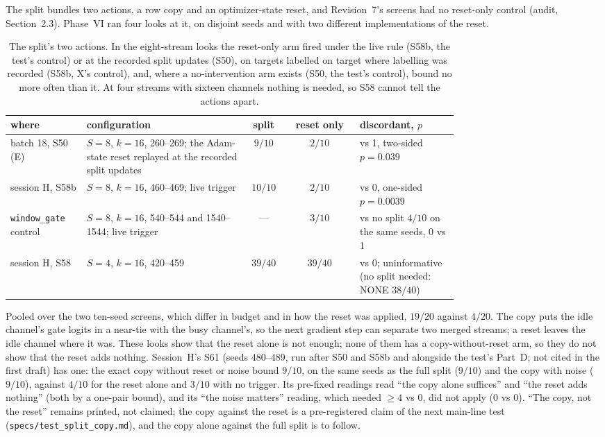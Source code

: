 \documentclass[11pt]{article}
\begin{document}
The split bundles two actions, a row copy and an optimizer-state reset, and Revision~7's screens had no reset-only control (audit, Section~2.3). Phase~VI ran four looks at it, on disjoint seeds and with two different implementations of the reset.

\begin{table}[h]
\centering
\small
\begin{tabular}{@{}>{\raggedright\arraybackslash}p{0.17\linewidth}>{\raggedright\arraybackslash}p{0.36\linewidth}cc>{\raggedright\arraybackslash}p{0.22\linewidth}@{}}
\toprule
where & configuration & split & reset only & discordant, $p$\\
\midrule
batch 18, S50 (E) & $S{=}8$, $k{=}16$, 260--269; the Adam-state reset replayed at the recorded split updates & $9/10$ & $2/10$ & 8 vs 1, two-sided $p = 0.039$\\
session H, S58b & $S{=}8$, $k{=}16$, 460--469; live trigger & $10/10$ & $2/10$ & 8 vs 0, one-sided $p = 0.0039$\\
\texttt{window\_gate} control & $S{=}8$, $k{=}16$, 540--544 and 1540--1544; live trigger & --- & $3/10$ & vs no split $4/10$ on the same seeds, 0 vs 1\\
session H, S58 & $S{=}4$, $k{=}16$, 420--459 & $39/40$ & $39/40$ & 0 vs 0; uninformative (no split needed: NONE $38/40$)\\
\bottomrule
\end{tabular}
\caption{The split's two actions. In the eight-stream looks the reset-only arm fired under the live rule (S58b, the test's control) or at the recorded split updates (S50), on targets labelled on target where labelling was recorded (S58b, X's control), and, where a no-intervention arm exists (S50, the test's control), bound no more often than it. At four streams with sixteen channels nothing is needed, so S58 cannot tell the actions apart.}
\label{tab:copy}
\end{table}

\noindent
Pooled over the two ten-seed screens, which differ in budget and in how the reset was applied, $19/20$ against $4/20$. The copy puts the idle channel's gate logits in a near-tie with the busy channel's, so the next gradient step can separate two merged streams; a reset leaves the idle channel where it was. These looks show that the reset alone is not enough; none of them has a copy-without-reset arm, so they do not show that the reset adds nothing. Session~H's S61 (seeds 480--489, run after S50 and S58b and alongside the test's Part~D; not cited in the first draft) has one: the exact copy without reset or noise bound $9/10$, on the same seeds as the full split ($9/10$) and the copy with noise ($9/10$), against $4/10$ for the reset alone and $3/10$ with no trigger. Its pre-fixed readings read ``the copy alone suffices'' and ``the reset adds nothing'' (both by a one-pair bound), and its ``the noise matters'' reading, which needed $\geq 4$ vs 0, did not apply (0 vs 0). ``The copy, not the reset'' remains printed, not claimed; the copy against the reset is a pre-registered claim of the next main-line test (\texttt{specs/test\_split\_copy.md}), and the copy alone against the full split is to follow.
\end{document}
